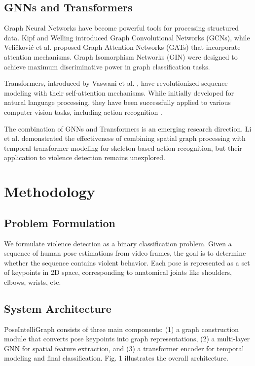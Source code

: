 \documentclass[conference]{IEEEtran}
\begin{document}
\subsection{GNNs and Transformers}
Graph Neural Networks have become powerful tools for processing structured data. Kipf and Welling \cite{kipf2017semi} introduced Graph Convolutional Networks (GCNs), while Veličković et al. \cite{velivckovic2018graph} proposed Graph Attention Networks (GATs) that incorporate attention mechanisms. Graph Isomorphism Networks (GIN) \cite{xu2018powerful} were designed to achieve maximum discriminative power in graph classification tasks.

Transformers, introduced by Vaswani et al. \cite{vaswani2017attention}, have revolutionized sequence modeling with their self-attention mechanisms. While initially developed for natural language processing, they have been successfully applied to various computer vision tasks, including action recognition \cite{girdhar2019video}.

The combination of GNNs and Transformers is an emerging research direction. Li et al. \cite{li2021spatio} demonstrated the effectiveness of combining spatial graph processing with temporal transformer modeling for skeleton-based action recognition, but their application to violence detection remains unexplored.

\section{Methodology}

\subsection{Problem Formulation}
We formulate violence detection as a binary classification problem. Given a sequence of human pose estimations from video frames, the goal is to determine whether the sequence contains violent behavior. Each pose is represented as a set of keypoints in 2D space, corresponding to anatomical joints like shoulders, elbows, wrists, etc.

\subsection{System Architecture}
PoseIntelliGraph consists of three main components: (1) a graph construction module that converts pose keypoints into graph representations, (2) a multi-layer GNN for spatial feature extraction, and (3) a transformer encoder for temporal modeling and final classification. Fig. 1 illustrates the overall architecture.
\end{document}

